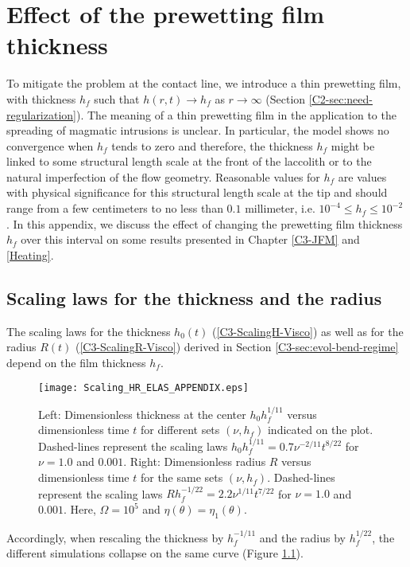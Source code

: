 \chapter{Effect of the prewetting film thickness}
\label{chap:A3}

To  mitigate the  problem at  the contact  line, we  introduce a  thin
prewetting     film,     with     thickness    $h_f$     such     that
$h(r,t)\rightarrow    h_f$   as    $r\rightarrow   \infty$    (Section
\ref{C2-sec:need-regularization}).  The  meaning of a  thin prewetting
film in  the application  to the spreading  of magmatic  intrusions is
unclear.  In  particular, the  model shows  no convergence  when $h_f$
tends to zero \citep{Lister:2013ia} and therefore, the thickness $h_f$
might be  linked to some structural  length scale at the  front of the
laccolith  or  to  the  natural imperfection  of  the  flow  geometry.
Reasonable values for $h_f$ are  values with physical significance for
this structural  length scale at the  tip and should range  from a few
centimeters    to    no    less   than    $0.1$    millimeter,    i.e.
$10^{-4}\le h_f \le 10^{-2}$ . In this appendix, we discuss the effect
of changing the prewetting film  thickness $h_f$ over this interval on
some results presented in Chapter \ref{C3-JFM} and \ref{Heating}.

\section{Scaling laws for the thickness and the radius}

The scaling laws for  the thickness $h_0(t)$ (\ref{C3-ScalingH-Visco})
as well as for the  radius $R(t)$ (\ref{C3-ScalingR-Visco}) derived in
Section  \ref{C3-sec:evol-bend-regime} depend  on the  film thickness
$h_f$.
\begin{figure}[h!]
  \begin{center}
    \graphicspath{ {/Users/thorey/Documents/These/Projet/Refroidissement/Skin_Model/Figure/JFM_V13/} }
    \texttt{[image: Scaling\_HR\_ELAS\_APPENDIX.eps]}
    \caption{Left:    Dimensionless    thickness   at    the    center
      $h_0h_f^{1/11}$ versus dimensionless time $t$ for different sets
      $(\nu,h_f)$ indicated  on the plot.  Dashed-lines  represent the
      scaling   laws   $h_0h_f^{1/11}=   0.7\nu^{-2/11}t^{8/22}$   for
      $\nu = 1.0$ and $0.001$.  Right: Dimensionless radius $R$ versus
      dimensionless   time  $t$   for  the   same  sets   $(\nu,h_f)$.
      Dashed-lines       represent        the       scaling       laws
      $Rh_f^{-1/22}=  2.2\nu^{1/11}t^{7/22}$  for   $\nu  =  1.0$  and
      $0.001$.          Here,        $\Omega=         10^5$        and
      $\eta(\theta)=\eta_1(\theta)$.}
    \label{Scaling_HR_ELAS_APPENDIX}
  \end{center}
\end{figure}
Accordingly,  when rescaling  the thickness  by $h_f^{-1/11}$  and the
radius by $h_f^{1/22}$, the different simulations collapse on the same
curve (Figure \ref{Scaling_HR_ELAS_APPENDIX}).

